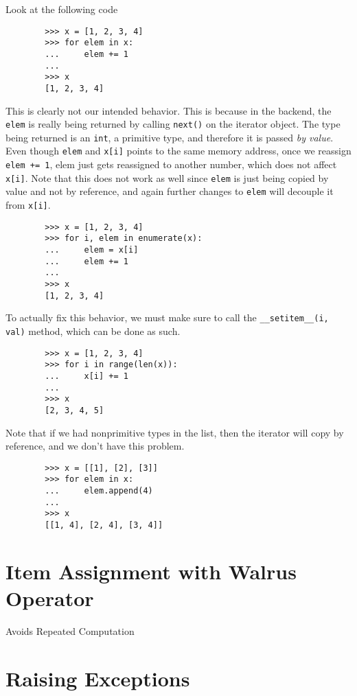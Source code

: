 \documentclass{article}
\begin{document}
    \begin{example}
      Look at the following code 
      \begin{lstlisting}
        >>> x = [1, 2, 3, 4]
        >>> for elem in x: 
        ...     elem += 1 
        ... 
        >>> x
        [1, 2, 3, 4] 
      \end{lstlisting}
      This is clearly not our intended behavior. This is because in the backend, the \texttt{elem} is really being returned by calling \texttt{next()} on the iterator object. The type being returned is an \texttt{int}, a primitive type, and therefore it is passed \textit{by value}. Even though \texttt{elem} and \texttt{x[i]} points to the same memory address, once we reassign \texttt{elem += 1}, elem just gets reassigned to another number, which does not affect \texttt{x[i]}. Note that this does not work as well since \texttt{elem} is just being copied by value and not by reference, and again further changes to \texttt{elem} will decouple it from \texttt{x[i]}. 
      \begin{lstlisting}
        >>> x = [1, 2, 3, 4] 
        >>> for i, elem in enumerate(x): 
        ...     elem = x[i]
        ...     elem += 1
        ... 
        >>> x
        [1, 2, 3, 4] 
      \end{lstlisting}
      To actually fix this behavior, we must make sure to call the \texttt{\_\_setitem\_\_(i, val)} method, which can be done as such. 
      \begin{lstlisting}
        >>> x = [1, 2, 3, 4]
        >>> for i in range(len(x)): 
        ...     x[i] += 1 
        ... 
        >>> x
        [2, 3, 4, 5] 
      \end{lstlisting}
      Note that if we had nonprimitive types in the list, then the iterator will copy by reference, and we don't have this problem. 
      \begin{lstlisting}
        >>> x = [[1], [2], [3]]
        >>> for elem in x: 
        ...     elem.append(4)
        ... 
        >>> x
        [[1, 4], [2, 4], [3, 4]] 
      \end{lstlisting}
    \end{example}
 
\section{Item Assignment with Walrus Operator}

  Avoids Repeated Computation

\section{Raising Exceptions}
\end{document}
